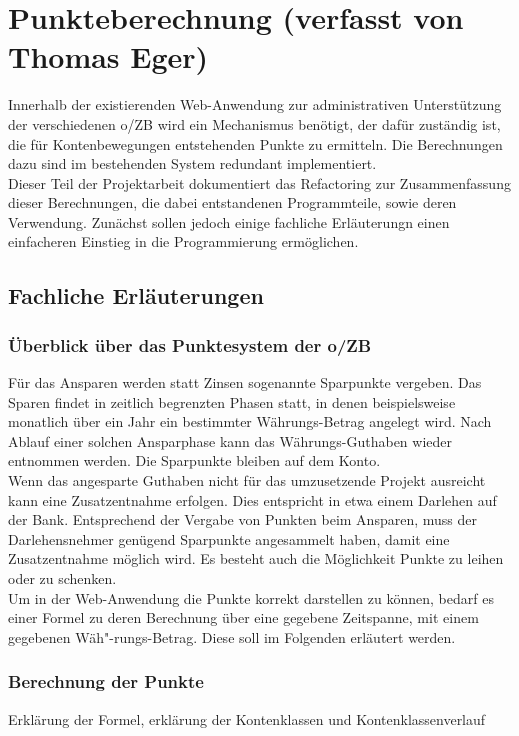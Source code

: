\documentclass[12pt]{scrreprt}
\begin{document}
  
\chapter{Punkteberechnung (verfasst von Thomas Eger)}

Innerhalb der existierenden Web-Anwendung zur administrativen Unterstützung der verschiedenen o/ZB wird ein Mechanismus benötigt, der dafür zuständig ist, die für Kontenbewegungen entstehenden Punkte zu ermitteln. Die Berechnungen dazu sind im bestehenden System redundant implementiert. \\

Dieser Teil der Projektarbeit dokumentiert das Refactoring zur Zusammenfassung dieser Berechnungen, die dabei entstandenen Programmteile, sowie deren Verwendung. Zunächst sollen jedoch einige fachliche Erläuterungn einen einfacheren Einstieg in die Programmierung ermöglichen.  

\section{Fachliche Erläuterungen}

\subsection{Überblick über das Punktesystem der o/ZB}
Für das Ansparen werden statt Zinsen sogenannte Sparpunkte vergeben. Das Sparen findet in zeitlich begrenzten Phasen statt, in denen beispielsweise monatlich über ein Jahr ein bestimmter Währungs-Betrag angelegt wird. Nach Ablauf einer solchen Ansparphase kann das Währungs-Guthaben wieder entnommen werden. Die Sparpunkte bleiben auf dem Konto. \\

Wenn das angesparte Guthaben nicht für das umzusetzende Projekt ausreicht kann eine Zusatzentnahme erfolgen. Dies entspricht in etwa einem Darlehen auf der Bank. Entsprechend der Vergabe von Punkten beim Ansparen, muss der Darlehensnehmer genügend Sparpunkte angesammelt haben, damit eine Zusatzentnahme möglich wird. Es besteht auch die Möglichkeit Punkte zu leihen oder zu schenken. \\

Um in der Web-Anwendung die Punkte korrekt darstellen zu können, bedarf es einer Formel zu deren Berechnung über eine gegebene Zeitspanne, mit einem gegebenen Wäh{"-}rungs-Betrag. Diese soll im Folgenden erläutert werden. 

\subsection{Berechnung der Punkte}
Erklärung der Formel, erklärung der Kontenklassen und Kontenklassenverlauf
\end{document}
